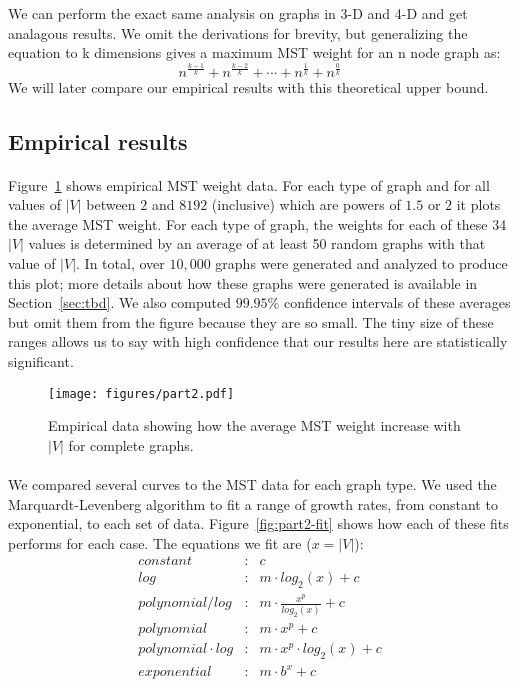 We can perform the exact same analysis on graphs in 3-D and 4-D and get
analagous results. We omit the derivations for brevity, but generalizing
the equation to k dimensions gives a maximum MST weight for an n node
graph as:
\[ n^{\frac{k-1}{k}} + n^{\frac{k-2}{k}} + \cdots + n^{\frac{1}{k}} +
n^{\frac{0}{k}} \]
We will later compare our empirical results with this theoretical upper
bound.

\subsection{Empirical results}
\paragraph{}
Figure~\ref{fig:part2} shows empirical MST weight data. For each type of
graph and for all values of $|V|$ 
between $2$ and $8192$ (inclusive) which are powers of $1.5$ or $2$ it
plots the average MST weight.  For each type of graph, the
weights for each of these 34 $|V|$ values is determined by
an average of at least 50 random graphs with that value of $|V|$.  In
total, over $10,000$ graphs
were generated and analyzed to produce this plot; more details about how
these graphs were generated is available in Section~\ref{sec:tbd}.  We
also computed $99.95\%$ confidence intervals of these averages but omit
them from the figure because they are so small.  The tiny size of these
ranges allows us to say with high confidence that our results here are
statistically significant.

\begin{figure}[htb!]
\centering
\texttt{[image: figures/part2.pdf]}
\caption{Empirical data showing how the average MST weight increase with $|V|$
  for complete graphs.}
\label{fig:part2}
\end{figure}

\paragraph{}
We compared several curves to the MST data for each graph type. We used the
Marquardt-Levenberg algorithm to fit a range of growth rates, from constant
to exponential, to each set of data.
Figure~\ref{fig:part2-fit} shows how each of these fits performs for each case.
The equations we fit are ($x = |V|$):
\begin{eqnarray*}
constant&:& c \\
log&:& m \cdot log_2(x) + c \\
polynomial / log&:& m \cdot \frac{x^p}{log_2(x)} + c \\
polynomial&:& m \cdot x^p + c \\
polynomial \cdot log&:& m \cdot x^p \cdot log_2(x) + c \\
exponential&:& m \cdot b^x + c
\end{eqnarray*}

